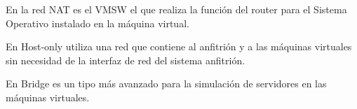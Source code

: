 En la red NAT es el VMSW el que realiza la función del router para el Sistema Operativo instalado en la máquina virtual.

En Host-only utiliza una red que contiene al anfitrión y a las máquinas virtuales sin necesidad de la interfaz de red del sistema anfitrión.

En Bridge es un tipo más avanzado para la simulación de servidores en las máquinas virtuales.








